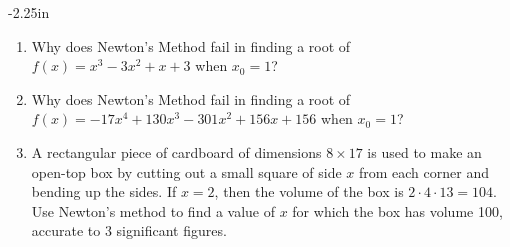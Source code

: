 \begin{adjustwidth*}{}{-2.25in}
\begin{multicols*}{2}
\begin{enumerate}[1),resume]
\item Why does Newton's Method fail in finding a root of $f(x) = x^3-3x^2+x+3$ when $x_0=1$?

\item Why does Newton's Method fail in finding a root of $f(x) = -17x^4+130x^3-301x^2+156x+156$ when $x_0=1$?

\item A rectangular piece of cardboard of dimensions $8\times 17$
is used to make an open-top box by cutting out a small square of side
$x$ from each corner and bending up the sides. 
If $x=2$, then the volume of the box is $2\cdot 4\cdot 13=104$. Use
Newton's method to find a value of $x$ for which the box has volume
100, accurate to 3 significant figures.

\end{enumerate}

\end{multicols*}
\end{adjustwidth*}

\afterexercises